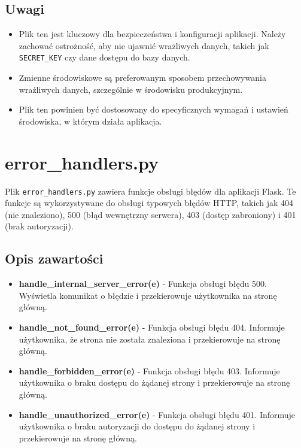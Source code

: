\documentclass[12pt,a4paper]{report}
\begin{document}
\subsection{Uwagi}
\begin{itemize}
    \item Plik ten jest kluczowy dla bezpieczeństwa i konfiguracji aplikacji. Należy zachować ostrożność, aby nie ujawnić wrażliwych danych, takich jak \texttt{SECRET\_KEY} czy dane dostępu do bazy danych.

    \item Zmienne środowiskowe są preferowanym sposobem przechowywania wrażliwych danych, szczególnie w środowisku produkcyjnym.

    \item Plik ten powinien być dostosowany do specyficznych wymagań i ustawień środowiska, w którym działa aplikacja.
\end{itemize}

\section{error\_handlers.py}
\label{sec:error_handlers}

Plik \texttt{error\_handlers.py} zawiera funkcje obsługi błędów dla aplikacji Flask. Te funkcje są wykorzystywane do obsługi typowych błędów HTTP, takich jak 404 (nie znaleziono), 500 (błąd wewnętrzny serwera), 403 (dostęp zabroniony) i 401 (brak autoryzacji).

\subsection{Opis zawartości}
\begin{itemize}
    \item \textbf{handle\_internal\_server\_error(e)} - Funkcja obsługi błędu 500. Wyświetla komunikat o błędzie i przekierowuje użytkownika na stronę główną.

    \item \textbf{handle\_not\_found\_error(e)} - Funkcja obsługi błędu 404. Informuje użytkownika, że strona nie została znaleziona i przekierowuje na stronę główną.

    \item \textbf{handle\_forbidden\_error(e)} - Funkcja obsługi błędu 403. Informuje użytkownika o braku dostępu do żądanej strony i przekierowuje na stronę główną.

    \item \textbf{handle\_unauthorized\_error(e)} - Funkcja obsługi błędu 401. Informuje użytkownika o braku autoryzacji do dostępu do żądanej strony i przekierowuje na stronę główną.
\end{itemize}
\end{document}
